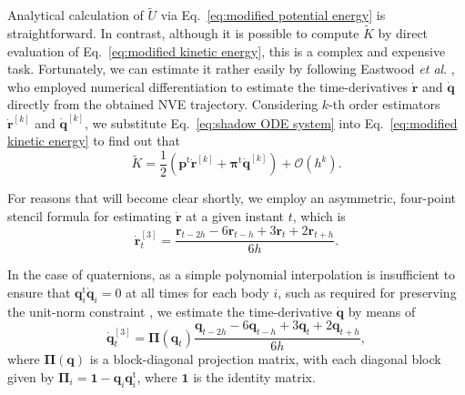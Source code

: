 \documentclass[
	aip,
	jcp,
	reprint,
]{revtex4-1}
\newcommand{\mt}[1]{\boldsymbol{\mathbf{#1}}}          %
\newcommand{\vt}[1]{\boldsymbol{\mathbf{#1}}}          %
\newcommand{\tr}[1]{#1^\text{t}}                       %
\newcommand{\timestep}{h}
\newcommand{\refined}[1]{\widetilde{#1}}
\begin{document}
Analytical calculation of $\refined U$ via Eq.~\eqref{eq:modified potential energy} is straightforward.
In contrast, although it is possible to compute $\refined K$ by direct evaluation of Eq.~\eqref{eq:modified kinetic energy}, this is a complex and expensive task.
Fortunately, we can estimate it rather easily by following Eastwood \textit{et al}. \cite{Eastwood_2010}, who employed numerical differentiation to estimate the time-derivatives $\dot{\vt r}$ and $\dot{\vt q}$ directly from the obtained NVE trajectory.
Considering $k$-th order estimators $\dot{\vt r}^{[k]}$ and $\dot{\vt q}^{[k]}$, we substitute Eq.~\eqref{eq:shadow ODE system} into Eq.~\eqref{eq:modified kinetic energy} to find out that
\begin{equation}
\label{eq:modified kinetic energy estimator}
\refined K = \frac{1}{2} \left( \tr{\vt p} \dot{\vt r}^{[k]} + \tr{\vt \pi} \dot{\vt q}^{[k]} \right) + \mathcal{O}(\timestep^k).
\end{equation}

For reasons that will become clear shortly, we employ an asymmetric, four-point stencil formula for estimating $\dot{\vt r}$ at a given instant $t$, which is
\begin{equation*}
\dot{\vt r}^{[3]}_t = \frac{{\vt r}_{t-2\timestep} - 6 {\vt r}_{t-\timestep} + 3 {\vt r}_t + 2 {\vt r}_{t+\timestep}}{6\timestep}.
\end{equation*}

In the case of quaternions, as a simple polynomial interpolation is insufficient to ensure that $\tr{\vt q}_i \dot{\vt q}_i = 0$ at all times for each body $i$, such as required for preserving the unit-norm constraint \cite{Silveira_2017}, we estimate the time-derivative $\dot{\vt q}$ by means of \cite{Schay_1995}
\begin{equation*}
\dot{\vt q}^{[3]}_t = {\mt \Pi}({\vt q}_t) \frac{{\vt q}_{t-2\timestep} - 6 {\vt q}_{t-\timestep} + 3 {\vt q}_t + 2 {\vt q}_{t+\timestep}}{6\timestep},
\end{equation*}
where ${\mt \Pi}(\vt q)$ is a block-diagonal projection matrix, with each diagonal block given by ${\mt \Pi}_i = {\mt 1} - {\vt q}_i \tr{\vt q}_i$, where $\mt 1$ is the identity matrix.
\end{document}
